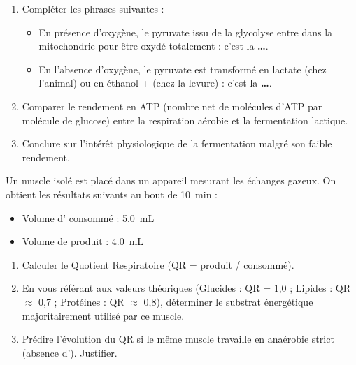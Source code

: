 \documentclass[11pt]{article}
\begin{document}
\begin{exercice}
\begin{enumerate}
    \item Compléter les phrases suivantes :
    \begin{itemize}
        \item En présence d'oxygène, le pyruvate issu de la glycolyse entre dans la mitochondrie pour être oxydé totalement : c'est la \textbf{\dots}.
        \item En l'absence d'oxygène, le pyruvate est transformé en lactate (chez l'animal) ou en éthanol +  (chez la levure) : c'est la \textbf{\dots}.
    \end{itemize}
    \item Comparer le rendement en ATP (nombre net de molécules d'ATP par molécule de glucose) entre la respiration aérobie et la fermentation lactique.
    \item Conclure sur l'intérêt physiologique de la fermentation malgré son faible rendement.
\end{enumerate}
\end{exercice}

\begin{exercice}
Un muscle isolé est placé dans un appareil mesurant les échanges gazeux. On obtient les résultats suivants au bout de \SI{10}{\minute} :
\begin{itemize}
    \item Volume d' consommé : \SI{5,0}{\milli\liter}
    \item Volume de  produit : \SI{4,0}{\milli\liter}
\end{itemize}
\begin{enumerate}
    \item Calculer le Quotient Respiratoire (QR =  produit /  consommé).
    \item En vous référant aux valeurs théoriques (Glucides : QR = 1,0 ; Lipides : QR $\approx$ 0,7 ; Protéines : QR $\approx$ 0,8), déterminer le substrat énergétique majoritairement utilisé par ce muscle.
    \item Prédire l'évolution du QR si le même muscle travaille en anaérobie strict (absence d'). Justifier.
\end{enumerate}
\end{exercice}
\end{document}
